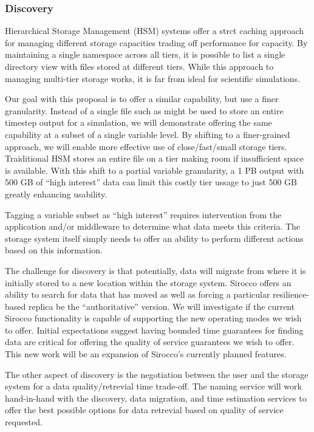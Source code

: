 \subsubsection{Discovery}

%
%

Hierarchical Storage Management (HSM) systems offer a strct caching approach
for managing different storage capacities trading off performance for capacity.
By maintaining a single namespace across all tiers, it is possible to list a
single directory view with files stored at different tiers. While this approach
to managing multi-tier storage works, it is far from ideal for scientific
simulations.

Our goal with this proposal is to offer a similar capability, but use a finer
granularity. Instead of a single file such as might be used to store an entire
timestep output for a simulation, we will demonstrate offering the same
capability at a subset of a single variable level. By shifting to a
finer-grained approach, we will enable more effective use of close/fast/small
storage tiers. Traiditional HSM stores an entire file on a tier making room if
insufficient space is available. With this shift to a partial variable
granularity, a 1 PB output with 500 GB of ``high interest'' data can limit this
costly tier ussage to just 500 GB greatly enhancing usability.

Tagging a variable subset as ``high interest'' requires intervention from the
application and/or middleware to determine what data meets this criteria. The
storage system itself simply needs to offer an ability to perform different
actions based on this information.

The challenge for discovery is that potentially, data will migrate from where
it is initially stored to a new location within the storage system. Sirocco
offers an ability to search for data that has moved as well as forcing a
particular resilience-based replica be the ``authoritative'' version. We will
investigate if the current Sirocco functionality is capable of supporting the
new operating modes we wish to offer. Initial expectations suggest having
bounded time guarantees for finding data are critical for offering the quality
of service guarantees we wish to offer. This new work will be an expansion of
Sirocco's currently planned features.

The other aspect of discovery is the negotiation between the user and the
storage system for a data quality/retrevial time trade-off. The naming service
will work hand-in-hand with the discovery, data migration, and time estimation
services to offer the best possible options for data retrevial based on quality
of service requested.
